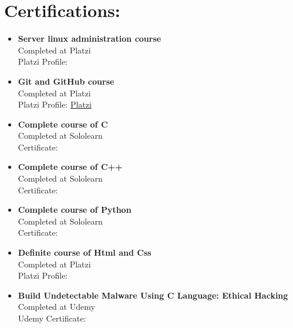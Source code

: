 \documentclass{article}
\begin{document}
\begin{minipage}[t]{8cm}
\vspace*{-2cm}
\section*{Certifications:}
    \begin{itemize}
        \item \textbf{Server linux administration course}\\
            Completed at Platzi\\
            Platzi Profile: \href{https://platzi.com/p/windowsky/}{\color{Blue}{Platzi}}
        \item \textbf{Git and GitHub course}\\
            Completed at Platzi\\
            Platzi Profile: \href{https://platzi.com/p/windowsky/}{Platzi}
        \item \textbf{Complete course of C}\\
            Completed at Sololearn\\
            Certificate: \href{https://www.sololearn.com/Certificate/1089-18624671/jpg/}{\color{Blue}{Sololearn}}
        \item \textbf{Complete course of C++}\\
            Completed at Sololearn\\
            Certificate: \href{https://www.sololearn.com/certificates/course/en/18624671/1051/landscape/png}{\color{Blue}{Sololearn}}
            
        \item \textbf{Complete course of Python}\\
            Completed at Sololearn\\
            Certificate: \href{https://www.sololearn.com/Certificate/1073-18624671/jpg/}{\color{Blue}{Sololearn}}
        \item \textbf{Definite course of Html and Css}\\
            Completed at Platzi\\
            Platzi Profile: \href{https://platzi.com/p/windowsky/}{\color{Blue}{Platzi}}
        \item \textbf{Build Undetectable Malware Using C Language: Ethical Hacking}\\
            Completed at Udemy\\
            Udemy Certificate: \href{https://udemy-certificate.s3.amazonaws.com/image/UC-d73db271-3352-4396-a747-56ca7b54dfb6.jpg?v=1623177409000}{\color{Blue}{Udemy}}
            

\end{itemize}
\end{minipage}
\end{document}
